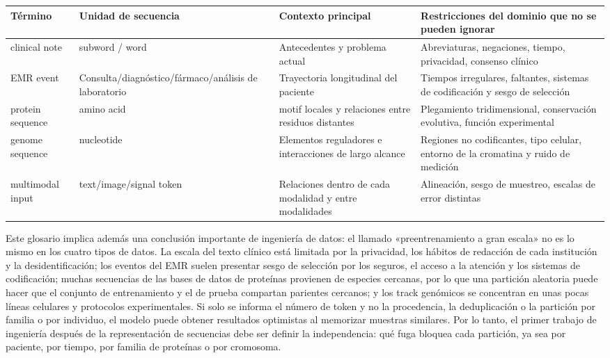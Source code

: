 
\begin{longtable}{@{}L{0.16\textwidth}L{0.19\textwidth}L{0.22\textwidth}L{0.31\textwidth}@{}}
\toprule
Término & Unidad de secuencia & Contexto principal & Restricciones del dominio que no se pueden ignorar \\
\midrule
clinical note & subword / word & Antecedentes y problema actual & Abreviaturas, negaciones, tiempo, privacidad, consenso clínico \\
EMR event & Consulta/diagnóstico/fármaco/análisis de laboratorio & Trayectoria longitudinal del paciente & Tiempos irregulares, faltantes, sistemas de codificación y sesgo de selección \\
protein sequence & amino acid & motif locales y relaciones entre residuos distantes & Plegamiento tridimensional, conservación evolutiva, función experimental \\
genome sequence & nucleotide & Elementos reguladores e interacciones de largo alcance & Regiones no codificantes, tipo celular, entorno de la cromatina y ruido de medición \\
multimodal input & text/image/signal token & Relaciones dentro de cada modalidad y entre modalidades & Alineación, sesgo de muestreo, escalas de error distintas \\
\bottomrule
\end{longtable}

Este glosario implica además una conclusión importante de ingeniería de datos: el llamado «preentrenamiento a gran escala» no es lo mismo en los cuatro tipos de datos. La escala del texto clínico está limitada por la privacidad, los hábitos de redacción de cada institución y la desidentificación; los eventos del EMR suelen presentar sesgo de selección por los seguros, el acceso a la atención y los sistemas de codificación; muchas secuencias de las bases de datos de proteínas provienen de especies cercanas, por lo que una partición aleatoria puede hacer que el conjunto de entrenamiento y el de prueba compartan parientes cercanos; y los track genómicos se concentran en unas pocas líneas celulares y protocolos experimentales. Si solo se informa el número de token y no la procedencia, la deduplicación o la partición por familia o por individuo, el modelo puede obtener resultados optimistas al memorizar muestras similares. Por lo tanto, el primer trabajo de ingeniería después de la representación de secuencias debe ser definir la independencia: qué fuga bloquea cada partición, ya sea por paciente, por tiempo, por familia de proteínas o por cromosoma.

